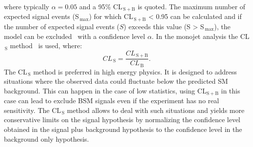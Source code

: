 where typically $\alpha = 0.05$ and a 95\% CL$_\mathrm{\, S+B}$ is quoted. The
maximum number of expected signal events (S$_\mathrm{\, max}$) for which
CL$_\mathrm{\, S+B}$ < 0.95 can be calculated and if the number of expected
signal events ($S$) exceeds this value (S > S$_\mathrm{\, max}$), the model can
be excluded~\cite{PawelThesis} with a confidence level $\alpha$. In the monojet
analysis the CL$_\mathrm{\, S}$ method~\cite{CLsMethod} is used, where:
\begin{equation}
  \label{eq:89}
  CL_\mathrm{\, S} = \frac{CL_\mathrm{\, S+B}}{CL_\mathrm{\, B}}.
\end{equation}
The CL$_\mathrm{\, S}$ method is preferred in high energy physics. It is
designed to address situations where the observed data could fluctuate below the
predicted SM background. This can happen in the case of low statistics, using
CL$_\mathrm{S + B}$ in this case can lead to exclude BSM signals even if the
experiment has no real sensitivity. The CL$_\mathrm{\, S}$ method allows to deal
with such situations and yields more conservative limits on the signal
hypothesis by normalizing the confidence level obtained in the signal plus
background hypothesis to the confidence level in the background only hypothesis.
